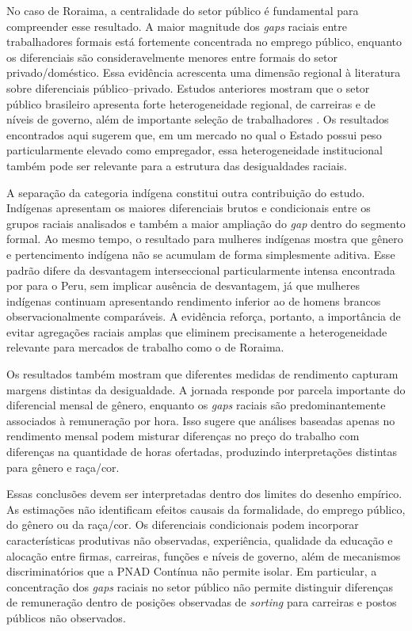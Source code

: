 \documentclass[12pt]{article}
\begin{document}
No caso de Roraima, a centralidade do setor público é fundamental para
compreender esse resultado. A maior magnitude dos \textit{gaps} raciais entre
trabalhadores formais está fortemente concentrada no emprego público, enquanto
os diferenciais são consideravelmente menores entre formais do setor
privado/doméstico. Essa evidência acrescenta uma dimensão regional à literatura
sobre diferenciais público--privado. Estudos anteriores mostram que o setor
público brasileiro apresenta forte heterogeneidade regional, de carreiras e de
níveis de governo, além de importante seleção de trabalhadores
\citep{foguel2000, moriconi2009, mattos2022, baez2021}. Os
resultados encontrados aqui sugerem que, em um mercado no qual o Estado possui
peso particularmente elevado como empregador, essa heterogeneidade institucional
também pode ser relevante para a estrutura das desigualdades raciais.

A separação da categoria indígena constitui outra contribuição do estudo.
Indígenas apresentam os maiores diferenciais brutos e condicionais entre os
grupos raciais analisados e também a maior ampliação do \textit{gap} dentro do segmento
formal. Ao mesmo tempo, o resultado para mulheres indígenas mostra que gênero e
pertencimento indígena não se acumulam de forma simplesmente aditiva. Esse
padrão difere da desvantagem interseccional particularmente intensa encontrada
por \citet{kolev2015} para o Peru, sem implicar ausência de
desvantagem, já que mulheres indígenas continuam apresentando rendimento inferior ao
de homens brancos observacionalmente comparáveis. A evidência reforça, portanto,
a importância de evitar agregações raciais amplas que eliminem precisamente a
heterogeneidade relevante para mercados de trabalho como o de Roraima.

Os resultados também mostram que diferentes medidas de rendimento capturam
margens distintas da desigualdade. A jornada responde por parcela importante
do diferencial mensal de gênero, enquanto os \textit{gaps} raciais são
predominantemente associados à remuneração por hora. Isso sugere que análises
baseadas apenas no rendimento mensal podem misturar diferenças no preço do
trabalho com diferenças na quantidade de horas ofertadas, produzindo
interpretações distintas para gênero e raça/cor. 

Essas conclusões devem ser interpretadas dentro dos limites do desenho
empírico. As estimações não identificam efeitos causais da formalidade, do
emprego público, do gênero ou da raça/cor. Os diferenciais condicionais podem
incorporar características produtivas não observadas, experiência, qualidade
da educação e alocação entre firmas, carreiras, funções e níveis de governo,
além de mecanismos discriminatórios que a PNAD Contínua não permite isolar.
Em particular, a concentração dos \textit{gaps} raciais no setor público não permite
distinguir diferenças de remuneração dentro de posições observadas de
\textit{sorting} para carreiras e postos públicos não observados.
\end{document}
